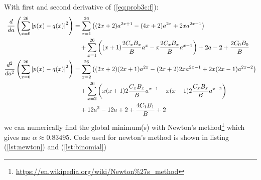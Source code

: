 \documentclass{assignment}
\begin{document}
\begin{enumerate}
\begin{enumerate}
    With first and second derivative of (\ref{eq:prob3c:f}):
    \begin{align*}
      \dfrac{d}{da}\left(\sum_{x=0}^{26} \left| p(x) -  q(x) \right|^2\right)
      & = \sum_{x=1}^{26} \left( (2x+2)a^{2x+1} - (4x+2)a^{2x} + 2xa^{2x-1}\right) \\
      & \quad + \sum_{x=1}^{26} \left( (x+1)\dfrac{2C_xB_x}{B} a^{x} - x\dfrac{2C_xB_x}{B} a^{x-1}\right)
        + 2a -2 + \dfrac{2C_0B_0}{B} \\
      \dfrac{d^2}{da^2}\left(\sum_{x=0}^{26} \left| p(x) -  q(x) \right|^2\right)
      & = \sum_{x=2}^{26}  \left((2x+2)(2x+1)a^{2x} - (2x+2)2xa^{2x-1} + 2x(2x-1)a^{2x-2}\right) \\
      & \quad  + \sum_{x=2}^{26} \left( x(x+1)2\dfrac{C_xB_x}{B} a^{x-1} - x(x-1)2\dfrac{C_xB_x}{B} a^{x-2}\right) \\
      & \quad + 12a^2 - 12a + 2 + \dfrac{4C_1B_1}{B} + 2
    \end{align*}
    we can numerically find the global minimum(s) with Newton's
    method\footnote{\url{https://en.wikipedia.org/wiki/Newton\%27s_method}} which gives me $\alpha \approx 0.83495$.
    Code used for newton's method is shown
    in listing (\ref{lst:newton}) and (\ref{lst:binomial})


\end{enumerate}
\end{enumerate}
\end{document}
